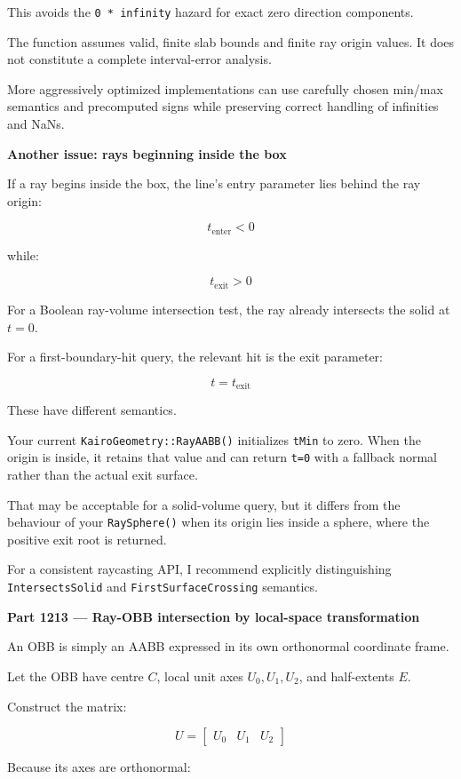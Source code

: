 This avoids the \texttt{0\ *\ infinity} hazard for exact zero direction components.

The function assumes valid, finite slab bounds and finite ray origin values. It does not constitute a complete interval-error analysis.

More aggressively optimized implementations can use carefully chosen min/max semantics and precomputed signs while preserving correct handling of infinities and NaNs.

\textbf{Another issue: rays beginning inside the box}

If a ray begins inside the box, the line's entry parameter lies behind the ray origin:

\[
t_{\mathrm{enter}}<0
\]

while:

\[
t_{\mathrm{exit}}>0
\]

For a Boolean ray-volume intersection test, the ray already intersects the solid at \(t=0\).

For a first-boundary-hit query, the relevant hit is the exit parameter:

\[
\boxed{t=t_{\mathrm{exit}}}
\]

These have different semantics.

Your current \texttt{KairoGeometry::RayAABB()} initializes \texttt{tMin} to zero. When the origin is inside, it retains that value and can return \texttt{t=0} with a fallback normal rather than the actual exit surface.

That may be acceptable for a solid-volume query, but it differs from the behaviour of your \texttt{RaySphere()} when its origin lies inside a sphere, where the positive exit root is returned.

For a consistent raycasting API, I recommend explicitly distinguishing \texttt{IntersectsSolid} and \texttt{FirstSurfaceCrossing} semantics.

\textbf{Part 1213 --- Ray-OBB intersection by local-space transformation}

An OBB is simply an AABB expressed in its own orthonormal coordinate frame.

Let the OBB have centre \(C\), local unit axes \(U_0,U_1,U_2\), and half-extents \(E\).

Construct the matrix:

\[
U= \begin{bmatrix} U_0&U_1&U_2 \end{bmatrix}
\]

Because its axes are orthonormal:


